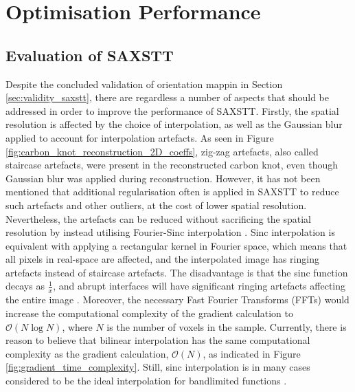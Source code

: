 \chapter{Optimisation Performance}\label{ch:optimisation_performance}

\section{Evaluation of SAXSTT}

Despite the concluded validation of orientation mappin in Section \ref{sec:validity_saxstt},
there are regardless a number of aspects that should be addressed in order to improve the performance of SAXSTT.
Firstly, the spatial resolution is affected by the choice of interpolation, as well as the Gaussian blur applied to account for interpolation artefacts.
As seen in Figure \ref{fig:carbon_knot_reconstruction_2D_coeffs}, zig-zag artefacts, also called staircase artefacts, were present in the reconstructed carbon knot, even though Gaussian blur was applied during reconstruction.
However, it has not been mentioned that additional regularisation often is applied in SAXSTT to reduce such artefacts and other outliers, at the cost of lower spatial resolution.
Nevertheless, the artefacts can be reduced without sacrificing the spatial resolution by instead utilising Fourier-Sinc interpolation \cite{Sinc_interpolation_2016}.
Sinc interpolation is equivalent with applying a rectangular kernel in Fourier space, which means that all pixels in real-space are affected, and the interpolated image has ringing artefacts instead of staircase artefacts. %
The disadvantage is that the sinc function decays as $\frac{1}{x}$, and abrupt interfaces will have significant ringing artefacts affecting the entire image \cite{ipol.2011.g_lmii}. %
Moreover, the necessary Fast Fourier Transforms (FFTs) would increase the computational complexity of the gradient calculation to $\mathcal{O}(N\log{N})$,
where $N$ is the number of voxels in the sample. %
Currently, there is reason to believe that bilinear interpolation has the same computational complexity as the gradient calculation, $\mathcal{O}(N)$, as indicated in Figure \ref{fig:gradient_time_complexity}.
Still, sinc interpolation is in many cases considered to be the ideal interpolation for bandlimited functions \cite{ipol.2011.g_lmii}. %

